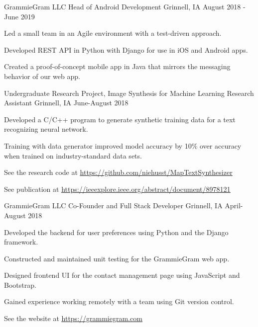 \documentclass[12pt, a4paper]{awesome-cv}
\begin{document}
\begin{cventries}
  \cventry
    {GrammieGram LLC}
    {Head of Android Development}
    {Grinnell, IA}
    {August 2018 - June 2019}
    {
      \begin{cvitems}
        \item {Led a small team in an Agile environment with a test-driven approach.}
      	\item {Developed REST API in Python with Django for use in iOS and Android apps.}
	      \item {Created a proof-of-concept mobile app in Java that mirrors the messaging behavior of our web app.}
      \end{cvitems}
    }


  \cventry
    {Undergraduate Research Project, Image Synthesis for Machine Learning}
    {Research Assistant}
    {Grinnell, IA}
    {June-August 2018}
    {
      \begin{cvitems}
        \item{Developed a C/C++ program to generate synthetic training data for a text recognizing neural network.}
        \item{Training with data generator improved model accuracy by 10\% over accuracy when trained on industry-standard data sets.}
	    \item{See the research code at \underline{\href{https://github.com/niehusst/MapTextSynthesizer}{https://github.com/niehusst/MapTextSynthesizer}}}
	    \item{See publication at \underline{\href{https://ieeexplore.ieee.org/abstract/document/8978121}{https://ieeexplore.ieee.org/abstract/document/8978121}}}
      \end{cvitems}
    }


  \cventry
    {GrammieGram LLC}
    {Co-Founder and Full Stack Developer}
    {Grinnell, IA}
    {April-August 2018}
    {
      \begin{cvitems}
        \item {Developed the backend for user preferences using Python and the Django framework.}
        \item {Constructed and maintained unit testing for the GrammieGram web app.}
        \item {Designed frontend UI for the contact management page using JavaScript and Bootstrap.}
        \item {Gained experience working remotely with a team using Git version control.}
	    \item {See the website at \underline{\href{https://grammiegram.com}{https://grammiegram.com}}}
      \end{cvitems}
    }



\end{cventries}
\end{document}
